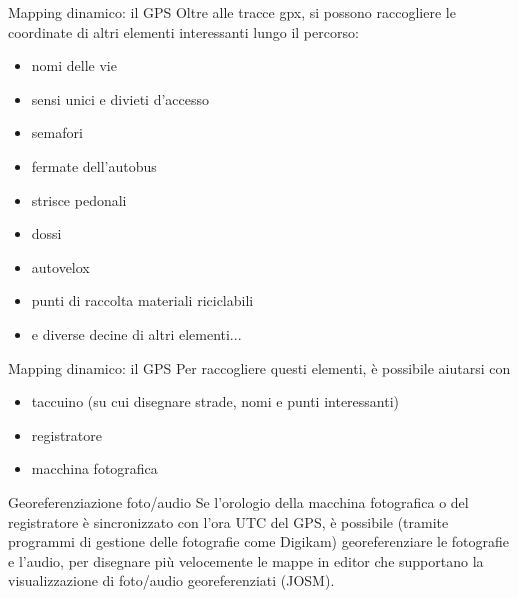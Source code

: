 \documentclass[slidestop,compress,red,notes,xcolor=dvipsnames]{beamer}	%
\begin{document}
        \begin{frame}{Mapping dinamico: il GPS}
            Oltre alle tracce gpx, si possono raccogliere le coordinate di altri elementi interessanti lungo il percorso:
            \begin{itemize}
                \item nomi delle vie
                \item sensi unici e divieti d'accesso
                \item semafori
                \item fermate dell'autobus
                \item strisce pedonali
                \item dossi
                \item autovelox
                \item punti di raccolta materiali riciclabili
                \item e diverse decine di altri elementi...
            \end{itemize}
        \end{frame}

        \begin{frame}{Mapping dinamico: il GPS}
            Per raccogliere questi elementi, è possibile aiutarsi con
            \pause
            \begin{itemize}
                \item taccuino (su cui disegnare strade, nomi e punti interessanti)
                \pause
                \item registratore
                \pause
                \item macchina fotografica
            \end{itemize}
            \pause
            \begin{block}{Georeferenziazione foto/audio}
                Se l'orologio della macchina fotografica o del registratore è sincronizzato con l'ora UTC del GPS, è possibile (tramite programmi di gestione delle fotografie come Digikam) georeferenziare le fotografie e l'audio, per disegnare più velocemente le mappe in editor che supportano la visualizzazione di foto/audio georeferenziati (JOSM).
            \end{block}
        \end{frame}
\end{document}
